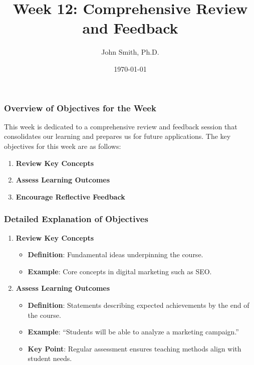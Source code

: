\documentclass[aspectratio=169]{beamer}
\begin{document}
\frame{\titlepage}

\begin{frame}[fragile]
    \title{Week 12: Comprehensive Review and Feedback}
    \author{John Smith, Ph.D.}
    \date{\today}
    \maketitle
\end{frame}

\begin{frame}[fragile]
    \frametitle{Overview of Objectives for the Week}
    This week is dedicated to a comprehensive review and feedback session that consolidates our learning and prepares us for future applications. The key objectives for this week are as follows:
    \begin{enumerate}
        \item \textbf{Review Key Concepts}
        \item \textbf{Assess Learning Outcomes}
        \item \textbf{Encourage Reflective Feedback}
    \end{enumerate}
\end{frame}

\begin{frame}[fragile]
    \frametitle{Detailed Explanation of Objectives}
    \begin{enumerate}
        \item \textbf{Review Key Concepts}
        \begin{itemize}
            \item \textbf{Definition}: Fundamental ideas underpinning the course.
            \item \textbf{Example}: Core concepts in digital marketing such as SEO.
        \end{itemize}

        \item \textbf{Assess Learning Outcomes}
        \begin{itemize}
            \item \textbf{Definition}: Statements describing expected achievements by the end of the course.
            \item \textbf{Example}: “Students will be able to analyze a marketing campaign.”
            \item \textbf{Key Point}: Regular assessment ensures teaching methods align with student needs.
        \end{itemize}
    \end{enumerate}
\end{frame}
\end{document}
